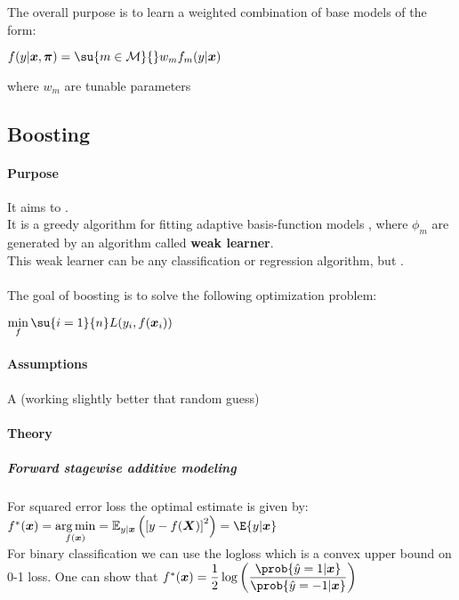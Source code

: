 The overall purpose is to learn a weighted combination of base models of the form:
\begin{center}
    $f(y|\bm{x},\bm{\pi}) = \su{m\in\mathcal{M}}{}w_{m}f_{m}(y|\bm{x})$
\end{center}
where $w_{m}$ are tunable parameters

\subsection{Boosting}
\paragraph{Purpose}
It aims to .\\
It is a greedy algorithm for fitting adaptive basis-function models , where $\phi_{m}$ are generated by an
algorithm called \textbf{weak learner}. \\
This weak learner can be any classification or regression algorithm, but .\\
\\
The goal of boosting is to solve the following optimization problem:
\begin{center}
    $\displaystyle\min_{f}\su{i=1}{n}L(y_{i},f(\bm{x}_{i}))$
\end{center}

\paragraph{Assumptions}
A  (working slightly better that random guess) 

\paragraph{Theory}
\subparagraph{Forward stagewise additive modeling}
For squared error loss the optimal estimate is given by: $f^{*}(\bm{x}) = \displaystyle
\argmin_{f(\bm{x})}=\mathbb{E}_{y|\bm{x}}\left(\left[y-f(\bm{X}) \right]^{2}\right) = \E{y|\bm{x}}$\\
For binary classification we can use the logloss which is a convex upper bound on 0-1 loss. One can
show that $f^{*}(\bm{x}) = \dfrac{1}{2}\log\left(\dfrac{\prob{\hat{y}=1|\bm{x}}}{\prob{\hat{y}=-1|
\bm{x}}}\right)$

